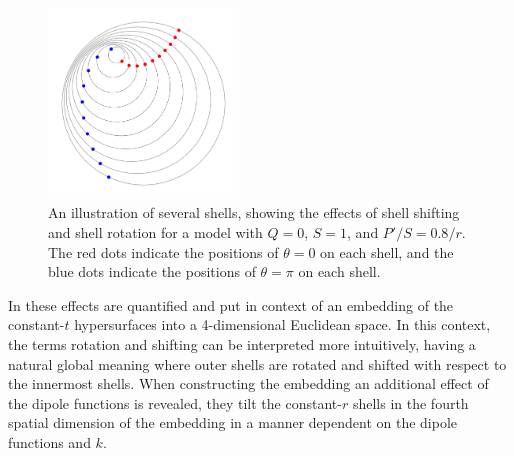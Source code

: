 \documentclass[a4paper,12pt]{report}
\begin{document}
\begin{figure}[t]
  \centering
  \includegraphics[width=0.45\textwidth]{shell rotation and shifting example.png}
  \caption{An illustration of several shells, showing the effects of shell shifting and shell rotation for a model with $Q=0$, $S=1$, and $P'/S = 0.8/r$. The red dots indicate the positions of $\theta=0$ on each shell, and the blue dots indicate the positions of $\theta = \pi$ on each shell.}
  \label{fig: szekeres - shell shifting and rotation}
\end{figure}

In \cite{RN1,RN2} these effects are quantified and put in context of an embedding of the constant-$t$ hypersurfaces into a 4-dimensional Euclidean space. In this context, the terms rotation and shifting can be interpreted more intuitively, having a natural global meaning where outer shells are rotated and shifted with respect to the innermost shells. When constructing the embedding an additional effect of the dipole functions is revealed, they tilt the constant-$r$ shells in the fourth spatial dimension of the embedding in a manner dependent on the dipole functions and $k$.
\end{document}
